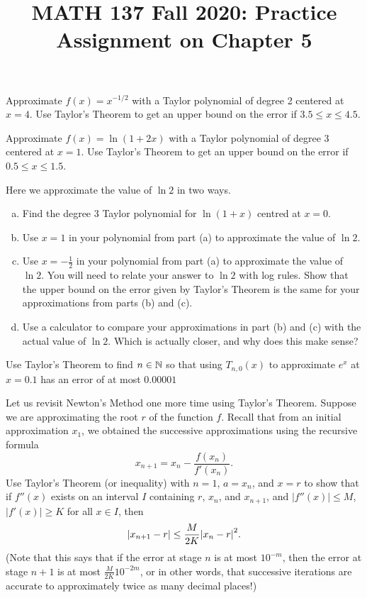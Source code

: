 
\title{MATH 137 Fall 2020: Practice Assignment on Chapter 5}


\thispagestyle{firstpage}
\textbf{\@title}

\question Approximate $f(x)=x^{-1/2}$ with a Taylor polynomial of degree 2 centered at $x=4$.
Use Taylor's Theorem to get an upper bound on the error if $3.5 \leq x \leq 4.5$.

\question Approximate $f(x)=\ln(1+2x)$ with a Taylor polynomial of degree 3 centered at $x=1$.
Use Taylor's Theorem to get an upper bound on the error if $0.5 \leq x \leq 1.5$.

\question Here we approximate the value of $\ln 2$ in two ways.
\begin{enumerate}[(a)]
  \item Find the degree 3 Taylor polynomial for $\ln(1+x)$ centred at $x = 0$.
  \item Use $x=1$ in your polynomial from part (a) to approximate the value of $\ln 2$.
  \item Use $x=-\frac12$ in your polynomial from part (a) to approximate the value of $\ln 2$.
        You will need to relate your answer to $\ln 2$ with log rules.
        Show that the upper bound on the error given by Taylor's Theorem is the same
        for your approximations from parts (b) and (c).
  \item Use a calculator to compare your approximations in part (b) and (c)
        with the actual value of $\ln 2$. Which is actually closer, and why does this make sense?
\end{enumerate}

\question Use Taylor's Theorem to find $n\in\mathbb{N}$ so that using $T_{n,0}(x)$
to approximate $e^x$ at $x=0.1$ has an error of at most $0.00001$

\question Let us revisit Newton's Method one more time using Taylor's Theorem.
Suppose we are approximating the root $r$ of the function $f$.
Recall that from an initial approximation $x_1$,
we obtained the successive approximations using the recursive formula
\[ x_{n+1} = x_n - \frac{f(x_n)}{f'(x_n)}. \]
Use Taylor's Theorem (or inequality) with $n=1$, $a=x_n$, and $x=r$
to show that if $f''(x)$ exists on an interval $I$ containing $r$, $x_n$, and $x_{n+1}$,
and $|f''(x)| \leq M$, $|f'(x)| \geq K$ for all $x \in I$, then
\[ \abs{x_{n+1}-r} \leq \frac{M}{2K}\abs{x_n-r}^2. \]
(Note that this says that if the error at stage $n$ is at most $10^{-m}$,
then the error at stage $n+1$ is at most $\frac{M}{2K}10^{-2m}$, or in other words,
that successive iterations are accurate to approximately twice as many decimal places!)

